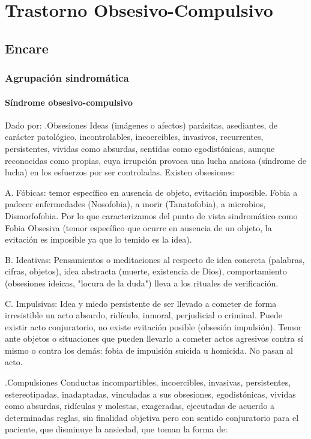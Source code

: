 \chapter{Trastorno Obsesivo-Compulsivo}
\section*{Encare}
\subsection*{Agrupación sindromática}
\subsubsection*{Síndrome obsesivo-compulsivo}
Dado por:
.Obsesiones
Ideas (imágenes o afectos) parásitas, asediantes, de carácter patológico, incontrolables, incoercibles, invasivos, recurrentes, persistentes, vividas como absurdas, sentidas como egodistónicas, aunque reconocidas como propias, cuya irrupción provoca una lucha ansiosa (síndrome de lucha) en los esfuerzos por ser controladas. Existen obsesiones:

A. Fóbicas: temor específico en ausencia de objeto, evitación imposible. Fobia a padecer enfermedades (Nosofobia), a morir (Tanatofobia), a microbios, Dismorfofobia. Por lo que caracterizamos del punto de vista sindromático como Fobia Obsesiva (temor específico que ocurre en ausencia de un objeto, la evitación es imposible ya que lo temido es la idea).

B. Ideativas: Pensamientos o meditaciones al respecto de idea concreta (palabras, cifras, objetos), idea abstracta (muerte, existencia de Dios), comportamiento (obsesiones ideicas, "locura de la duda") lleva a los rituales de verificación.

C. Impulsivas: Idea y miedo persistente de ser llevado a cometer de forma irresistible un acto absurdo, ridículo, inmoral, perjudicial o criminal. Puede existir acto conjuratorio, no existe evitación posible (obsesión impulsión). Temor ante objetos o situaciones que pueden llevarlo a cometer actos agresivos contra sí mismo o contra los demás: fobia de impulsión suicida u homicida. No pasan al acto.

.Compulsiones
Conductas incompartibles, incoercibles, invasivas, persistentes, estereotipadas, inadaptadas, vinculadas a sus obsesiones, egodistónicas, vividas como absurdas, ridículas y molestas, exageradas, ejecutadas de acuerdo a determinadas reglas, sin finalidad objetiva pero con sentido conjuratorio para el paciente, que disminuye la ansiedad, que toman la forma de:

